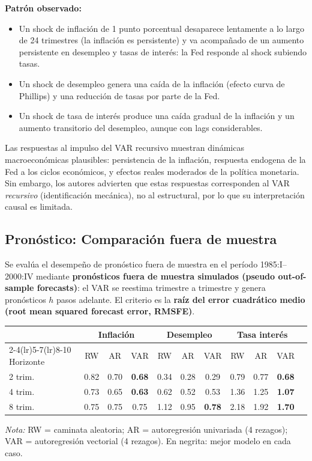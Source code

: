 \documentclass[12pt]{article}
\begin{document}
\textbf{Patr\'on observado:}
\begin{itemize}
  \item Un shock de inflaci\'on de 1 punto porcentual desaparece lentamente a lo largo de 24 trimestres (la inflaci\'on es persistente) y va acompa\~nado de un aumento persistente en desempleo y tasas de inter\'es: la Fed responde al shock subiendo tasas.
  \item Un shock de desempleo genera una ca\'ida de la inflaci\'on (efecto curva de Phillips) y una reducci\'on de tasas por parte de la Fed.
  \item Un shock de tasa de inter\'es produce una ca\'ida gradual de la inflaci\'on y un aumento transitorio del desempleo, aunque con lags considerables.
\end{itemize}

\begin{hallazgo}
Las respuestas al impulso del VAR recursivo muestran din\'amicas macroecon\'omicas plausibles: persistencia de la inflaci\'on, respuesta endogena de la Fed a los ciclos econ\'omicos, y efectos reales moderados de la pol\'itica monetaria. Sin embargo, los autores advierten que estas respuestas corresponden al VAR \textit{recursivo} (identificaci\'on mec\'anica), no al estructural, por lo que su interpretaci\'on causal es limitada.
\end{hallazgo}

\subsection{Pron\'ostico: Comparaci\'on fuera de muestra}

Se eval\'ua el desempe\~no de pron\'ostico fuera de muestra en el per\'iodo 1985:I--2000:IV mediante \textbf{pron\'osticos fuera de muestra simulados (pseudo out-of-sample forecasts)}: el VAR se reestima trimestre a trimestre y genera pron\'osticos $h$ pasos adelante. El criterio es la \textbf{ra\'iz del error cuadr\'atico medio (root mean squared forecast error, RMSFE)}.

\begin{center}
\begin{tabular}{lcccccccccc}
\toprule
 & \multicolumn{3}{c}{\textbf{Inflaci\'on}} & \multicolumn{3}{c}{\textbf{Desempleo}} & \multicolumn{3}{c}{\textbf{Tasa inter\'es}} \\
\cmidrule(lr){2-4}\cmidrule(lr){5-7}\cmidrule(lr){8-10}
Horizonte & RW & AR & VAR & RW & AR & VAR & RW & AR & VAR \\
\midrule
2 trim. & 0.82 & 0.70 & \textbf{0.68} & 0.34 & 0.28 & 0.29 & 0.79 & 0.77 & \textbf{0.68} \\
4 trim. & 0.73 & 0.65 & \textbf{0.63} & 0.62 & 0.52 & 0.53 & 1.36 & 1.25 & \textbf{1.07} \\
8 trim. & 0.75 & 0.75 & 0.75 & 1.12 & 0.95 & \textbf{0.78} & 2.18 & 1.92 & \textbf{1.70} \\
\bottomrule
\end{tabular}
\end{center}
\vspace{4pt}
\textit{Nota:} RW = caminata aleatoria; AR = autoregresi\'on univariada (4 rezagos); VAR = autoregresi\'on vectorial (4 rezagos). En negrita: mejor modelo en cada caso.
\end{document}
